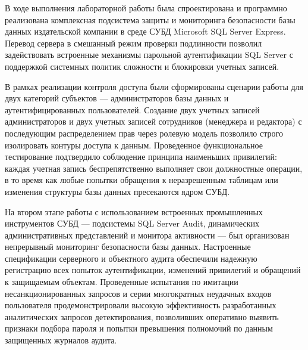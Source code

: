 \newpage
{}

В ходе выполнения лабораторной работы была спроектирована и программно реализована комплексная подсистема защиты и мониторинга безопасности базы данных издательской компании  в среде СУБД Microsoft SQL Server Express. 
Перевод сервера в смешанный режим проверки подлинности позволил задействовать встроенные механизмы парольной аутентификации SQL Server с поддержкой системных политик сложности и блокировки учетных записей.

В рамках реализации контроля доступа были сформированы сценарии работы для двух категорий субъектов --- администраторов базы данных и аутентифицированных пользователей.
Создание двух учетных записей администраторов и двух учетных записей сотрудников (менеджера и редактора) с последующим распределением прав через ролевую модель позволило строго изолировать контуры доступа к данным.
Проведенное функциональное тестирование подтвердило соблюдение принципа наименьших привилегий: каждая учетная запись беспрепятственно выполняет свои должностные операции, в то время как любые попытки обращения к неразрешенным таблицам или изменения структуры базы данных пресекаются ядром СУБД.

На втором этапе работы с использованием встроенных промышленных инструментов СУБД --- подсистемы SQL Server Audit, динамических административных представлений и монитора активности --- был организован непрерывный мониторинг безопасности базы данных.
Настроенные спецификации серверного и объектного аудита обеспечили надежную регистрацию всех попыток аутентификации, изменений привилегий и обращений к защищаемым объектам.
Проведенные испытания по имитации несанкционированных запросов и серии многократных неудачных входов пользователя продемонстрировали высокую эффективность разработанных аналитических запросов детектирования, позволивших оперативно выявить признаки подбора пароля и попытки превышения полномочий по данным защищенных журналов аудита.